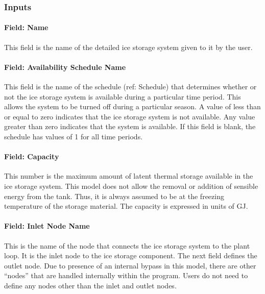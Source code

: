 \subsubsection{Inputs}\label{inputs-21-004}

\paragraph{Field: Name}\label{field-name-21-001}

This field is the name of the detailed ice storage system given to it by the user.

\paragraph{Field: Availability Schedule Name}\label{field-availability-schedule-name-012}

This field is the name of the schedule (ref: Schedule) that determines whether or not the ice storage system is available during a particular time period. This allows the system to be turned off during a particular season. A value of less than or equal to zero indicates that the ice storage system is not available. Any value greater than zero indicates that the system is available. If this field is blank, the schedule has values of 1 for all time periods.

\paragraph{Field: Capacity}\label{field-capacity-1-000}

This number is the maximum amount of latent thermal storage available in the ice storage system. This model does not allow the removal or addition of sensible energy from the tank. Thus, it is always assumed to be at the freezing temperature of the storage material. The capacity is expressed in units of GJ.

\paragraph{Field: Inlet Node Name}\label{field-inlet-node-name-1-001}

This is the name of the node that connects the ice storage system to the plant loop. It is the inlet node to the ice storage component. The next field defines the outlet node. Due to presence of an internal bypass in this model, there are other ``nodes'' that are handled internally within the program. Users do not need to define any nodes other than the inlet and outlet nodes.

